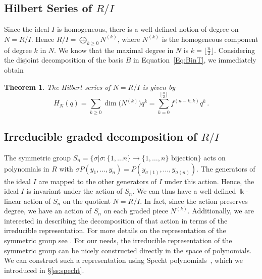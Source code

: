 \documentclass[10pt,a4paper]{article}
\newtheorem{theorem}{Theorem}[section]
\def\field{\Bbbk}
\begin{document}
\subsection{Hilbert  Series of $R/I$}\label{ss:hilbert}
Since the ideal $I$ is homogeneous, there is a well-defined notion of degree on $N=R/I$. Hence $R/I=\bigoplus_{k\ge 0} N^{(k)}$, 
where $N^{(k)}$ is the homogeneous component of degree $k$ in $N$. We know that the maximal degree in $N$ is $k= \lfloor \frac{n}{2} \rfloor$.
Considering the disjoint decomposition of the basis $B$ in  Equation~\eqref{Eq:BinT}, we immediately obtain
\begin{theorem}\label{thm:hlbert}
 The Hilbert series of $N=R/I$ is given by
 $$ H_N(q) = \sum_{k\ge 0} \dim\big( N^{(k)}\big) q^k = \sum_{k=0}^{ \lfloor \frac{n}{2} \rfloor} f^{(n-k,k)} q^k\,.
 $$
\end{theorem}


\subsection{Irreducible graded decomposition of $R/I$}\label{ss:irreducible}
The symmetric group $S_n=\big\{ \sigma \big| \sigma\colon \{1,\ldots n\}\to\{1,\ldots,n\}\text{ bijection}\big\}$ acts on polynomials in $R$ with\break 
$\sigma P(y_1,\ldots,y_n)=P(y_{\sigma(1)},\ldots,y_{\sigma(n)})$. The generators of the ideal $I$ are mapped to the other generators of $I$ under this action. Hence, the ideal $I$ is invariant under the action of $S_n$. We can thus have a well-defined $\field$-linear action of $S_n$ on the quotient $N=R/I$. In fact, since the  action preserves degree, we have an action of $S_n$ on each graded piece $N^{(k)}$. Additionally, we are interested in describing the decomposition of that action in terms of the irreducible representation. For more details on the representation of the symmetric group see  \cite{Sagan}. For our needs, the irreducible representation of the symmetric group can be nicely constructed directly in the space of polynomials. We can construct such a representation using Specht polynomials~\cite{Specht}, which we introduced in \S\ref{ss:specht}.
\end{document}
